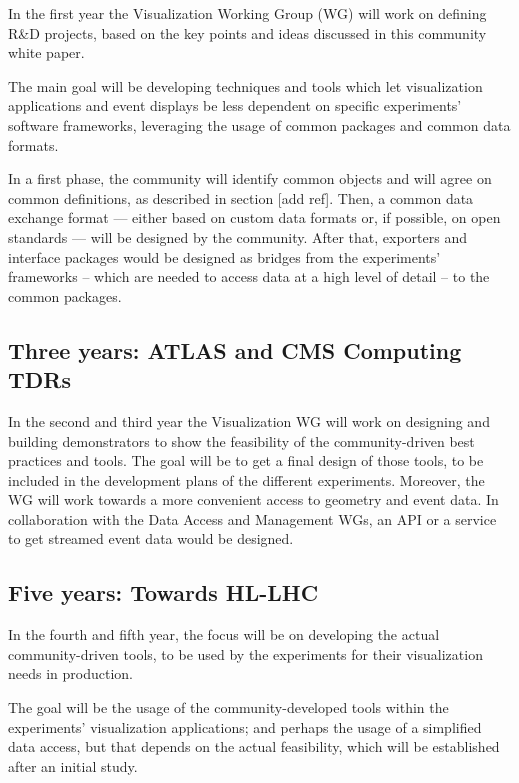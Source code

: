 \documentclass[12pt,a4paper]{article}
\begin{document}
In the first year the Visualization Working Group (WG) will work on defining R{\&}D projects, based on the key
points and ideas discussed in this community white paper.

The main goal will be developing techniques and tools which let visualization applications and event displays be
less dependent on specific experiments’ software frameworks, leveraging the usage of common packages and common data formats.

In a first phase, the community will identify common objects and will agree on common definitions, as described in
section [add ref]. Then, a common data exchange format --- either based on custom data formats or, if possible, on
open standards --- will be designed by the community. After that, exporters and interface packages would be designed
as bridges from the experiments’ frameworks -- which are needed to access data at a high level of detail -- to the common packages.

\hypertarget{three-year}{%
\subsection{Three years: ATLAS and CMS Computing TDRs}\label{three-year}}

In the second and third year the Visualization WG will work on designing and building demonstrators to show the feasibility of
the community-driven best practices and tools. The goal will be to get a final design of those tools, to be included in the development
plans of the different experiments. Moreover, the WG will work towards a more convenient access to geometry and event data.
In collaboration with the Data Access and Management WGs, an API or a service to get streamed event data would be designed.

\hypertarget{five-year}{%
\subsection{Five years: Towards HL-LHC}\label{five-year}}

In the fourth and fifth year, the focus will be on developing the actual community-driven tools, to be used by the experiments
for their visualization needs in production.

The goal will be the usage of the community-developed tools within the experiments’ visualization applications; and
perhaps the usage of a simplified data access, but that depends on the actual feasibility, which will be established
after an initial study.
\end{document}
